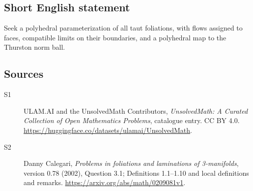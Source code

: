 \documentclass[11pt]{article}
\begin{document}
\subsection{Short English statement}
Seek a polyhedral parameterization of all taut foliations, with flows assigned to faces, compatible limits on their boundaries, and a polyhedral map to the Thurston norm ball.
\subsection{Sources}
\begin{description}
\item[\hypertarget{source:statement:1}{S1}] ULAM.AI and the UnsolvedMath Contributors, \emph{UnsolvedMath: A Curated Collection of Open Mathematics Problems}, catalogue entry. CC BY 4.0. \url{https://huggingface.co/datasets/ulamai/UnsolvedMath}.
\item[\hypertarget{source:statement:2}{S2}] Danny Calegari, \emph{Problems in foliations and laminations of 3-manifolds}, version 0.78 (2002), Question 3.1; Definitions 1.1--1.10 and local definitions and remarks. \url{https://arxiv.org/abs/math/0209081v1}.
\end{description}
\label{end:statement}
\end{document}
